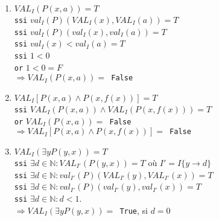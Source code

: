     {\setlength{\baselineskip}{1.3\baselineskip} %
    
    \begin{enumerate}
    
    \item 

    $VAL_I(P(x,a)) = T$
    \\
    \texttt{ssi} $val_I(P)(VAL_I(x),VAL_I(a)) = T$
    \\
    \texttt{ssi} $val_I(P)(val_I(x),val_I(a)) = T$
    \\
    \texttt{ssi} $val_I(x) < val_{I}(a) = T$
    \\
    \texttt{ssi} $1<0$    
    \\
    \texttt{or} $1<0 = F$
    \\
    $\Rightarrow VAL_I(P(x,a)) = $\texttt{ False} 
    
    \item


    $VAL_I[P(x,a) \land P(x, f(x))] = T$
    \\
    \texttt{ssi} $VAL_I(P(x,a)) \land VAL_I(P(x,f(x))) = T$
    \\
    \texttt{or} $VAL_I(P(x,a)) = $\texttt{ False} 
    \\
    $\Rightarrow VAL_I[P(x,a) \land P(x, f(x))] = $\texttt{ False} 

	\item    
    
    $VAL_I(\exists y P(y,x)) = T$
    \\
    \texttt{ssi} $\exists d\in \mathbb{N}: VAL_{I'}(P(y,x)) = T$ où $I' = I\{y\rightarrow d\}$
    \\
    \texttt{ssi} $\exists d\in \mathbb{N}: val_{I'}(P)(VAL_{I'}(y),VAL_{I'}(x)) = T$
    \\
    \texttt{ssi} $\exists d\in \mathbb{N}: val_{I'}(P)(val_{I'}(y),val_{I'}(x)) = T$ 
    \\
    \texttt{ssi} $\exists d\in \mathbb{N}: d < 1$. 
    \\
    $\Rightarrow VAL_I(\exists y P(y,x)) = $\texttt{ True}, si $d=0$
    


\end{enumerate}}
